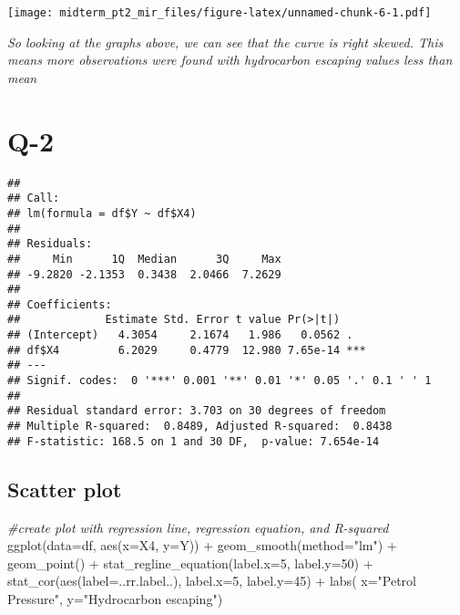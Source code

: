 \documentclass[
]{article}
\newenvironment{Shaded}{\begin{snugshade}}{\end{snugshade}}
\newcommand{\AttributeTok}[1]{\textcolor[rgb]{0.77,0.63,0.00}{#1}}
\newcommand{\CommentTok}[1]{\textcolor[rgb]{0.56,0.35,0.01}{\textit{#1}}}
\newcommand{\DecValTok}[1]{\textcolor[rgb]{0.00,0.00,0.81}{#1}}
\newcommand{\FunctionTok}[1]{\textcolor[rgb]{0.00,0.00,0.00}{#1}}
\newcommand{\NormalTok}[1]{#1}
\newcommand{\OtherTok}[1]{\textcolor[rgb]{0.56,0.35,0.01}{#1}}
\newcommand{\SpecialCharTok}[1]{\textcolor[rgb]{0.00,0.00,0.00}{#1}}
\newcommand{\StringTok}[1]{\textcolor[rgb]{0.31,0.60,0.02}{#1}}
\begin{document}
\texttt{[image: midterm\_pt2\_mir\_files/figure-latex/unnamed-chunk-6-1.pdf]}

\emph{So looking at the graphs above, we can see that the curve is right
skewed. This means more observations were found with hydrocarbon
escaping values less than mean}

\hypertarget{q-2}{%
\section{Q-2}\label{q-2}}

\begin{Shaded}
\end{Shaded}

\begin{verbatim}
## 
## Call:
## lm(formula = df$Y ~ df$X4)
## 
## Residuals:
##     Min      1Q  Median      3Q     Max 
## -9.2820 -2.1353  0.3438  2.0466  7.2629 
## 
## Coefficients:
##             Estimate Std. Error t value Pr(>|t|)    
## (Intercept)   4.3054     2.1674   1.986   0.0562 .  
## df$X4         6.2029     0.4779  12.980 7.65e-14 ***
## ---
## Signif. codes:  0 '***' 0.001 '**' 0.01 '*' 0.05 '.' 0.1 ' ' 1
## 
## Residual standard error: 3.703 on 30 degrees of freedom
## Multiple R-squared:  0.8489, Adjusted R-squared:  0.8438 
## F-statistic: 168.5 on 1 and 30 DF,  p-value: 7.654e-14
\end{verbatim}

\hypertarget{scatter-plot}{%
\subsection{Scatter plot}\label{scatter-plot}}

\begin{Shaded}
\begin{Highlighting}[]
\CommentTok{\#create plot with regression line, regression equation, and R{-}squared}
\FunctionTok{ggplot}\NormalTok{(}\AttributeTok{data=}\NormalTok{df, }\FunctionTok{aes}\NormalTok{(}\AttributeTok{x=}\NormalTok{X4, }\AttributeTok{y=}\NormalTok{Y)) }\SpecialCharTok{+}
        \FunctionTok{geom\_smooth}\NormalTok{(}\AttributeTok{method=}\StringTok{"lm"}\NormalTok{) }\SpecialCharTok{+}
        \FunctionTok{geom\_point}\NormalTok{() }\SpecialCharTok{+}
        \FunctionTok{stat\_regline\_equation}\NormalTok{(}\AttributeTok{label.x=}\DecValTok{5}\NormalTok{, }\AttributeTok{label.y=}\DecValTok{50}\NormalTok{) }\SpecialCharTok{+}
        \FunctionTok{stat\_cor}\NormalTok{(}\FunctionTok{aes}\NormalTok{(}\AttributeTok{label=}\NormalTok{..rr.label..), }\AttributeTok{label.x=}\DecValTok{5}\NormalTok{, }\AttributeTok{label.y=}\DecValTok{45}\NormalTok{) }\SpecialCharTok{+} \FunctionTok{labs}\NormalTok{( }\AttributeTok{x=}\StringTok{"Petrol Pressure"}\NormalTok{, }\AttributeTok{y=}\StringTok{"Hydrocarbon escaping"}\NormalTok{)}
\end{Highlighting}
\end{Shaded}
\end{document}
